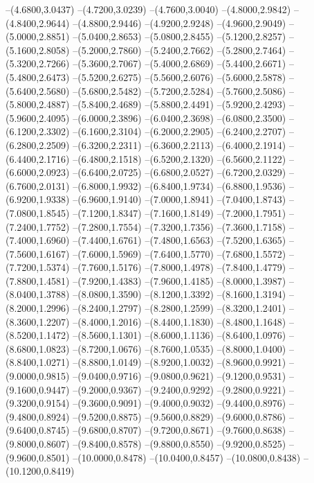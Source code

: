 {	--(4.6800,3.0437)
	--(4.7200,3.0239)
	--(4.7600,3.0040)
	--(4.8000,2.9842)
	--(4.8400,2.9644)
	--(4.8800,2.9446)
	--(4.9200,2.9248)
	--(4.9600,2.9049)
	--(5.0000,2.8851)
	--(5.0400,2.8653)
	--(5.0800,2.8455)
	--(5.1200,2.8257)
	--(5.1600,2.8058)
	--(5.2000,2.7860)
	--(5.2400,2.7662)
	--(5.2800,2.7464)
	--(5.3200,2.7266)
	--(5.3600,2.7067)
	--(5.4000,2.6869)
	--(5.4400,2.6671)
	--(5.4800,2.6473)
	--(5.5200,2.6275)
	--(5.5600,2.6076)
	--(5.6000,2.5878)
	--(5.6400,2.5680)
	--(5.6800,2.5482)
	--(5.7200,2.5284)
	--(5.7600,2.5086)
	--(5.8000,2.4887)
	--(5.8400,2.4689)
	--(5.8800,2.4491)
	--(5.9200,2.4293)
	--(5.9600,2.4095)
	--(6.0000,2.3896)
	--(6.0400,2.3698)
	--(6.0800,2.3500)
	--(6.1200,2.3302)
	--(6.1600,2.3104)
	--(6.2000,2.2905)
	--(6.2400,2.2707)
	--(6.2800,2.2509)
	--(6.3200,2.2311)
	--(6.3600,2.2113)
	--(6.4000,2.1914)
	--(6.4400,2.1716)
	--(6.4800,2.1518)
	--(6.5200,2.1320)
	--(6.5600,2.1122)
	--(6.6000,2.0923)
	--(6.6400,2.0725)
	--(6.6800,2.0527)
	--(6.7200,2.0329)
	--(6.7600,2.0131)
	--(6.8000,1.9932)
	--(6.8400,1.9734)
	--(6.8800,1.9536)
	--(6.9200,1.9338)
	--(6.9600,1.9140)
	--(7.0000,1.8941)
	--(7.0400,1.8743)
	--(7.0800,1.8545)
	--(7.1200,1.8347)
	--(7.1600,1.8149)
	--(7.2000,1.7951)
	--(7.2400,1.7752)
	--(7.2800,1.7554)
	--(7.3200,1.7356)
	--(7.3600,1.7158)
	--(7.4000,1.6960)
	--(7.4400,1.6761)
	--(7.4800,1.6563)
	--(7.5200,1.6365)
	--(7.5600,1.6167)
	--(7.6000,1.5969)
	--(7.6400,1.5770)
	--(7.6800,1.5572)
	--(7.7200,1.5374)
	--(7.7600,1.5176)
	--(7.8000,1.4978)
	--(7.8400,1.4779)
	--(7.8800,1.4581)
	--(7.9200,1.4383)
	--(7.9600,1.4185)
	--(8.0000,1.3987)
	--(8.0400,1.3788)
	--(8.0800,1.3590)
	--(8.1200,1.3392)
	--(8.1600,1.3194)
	--(8.2000,1.2996)
	--(8.2400,1.2797)
	--(8.2800,1.2599)
	--(8.3200,1.2401)
	--(8.3600,1.2207)
	--(8.4000,1.2016)
	--(8.4400,1.1830)
	--(8.4800,1.1648)
	--(8.5200,1.1472)
	--(8.5600,1.1301)
	--(8.6000,1.1136)
	--(8.6400,1.0976)
	--(8.6800,1.0823)
	--(8.7200,1.0676)
	--(8.7600,1.0535)
	--(8.8000,1.0400)
	--(8.8400,1.0271)
	--(8.8800,1.0149)
	--(8.9200,1.0032)
	--(8.9600,0.9921)
	--(9.0000,0.9815)
	--(9.0400,0.9716)
	--(9.0800,0.9621)
	--(9.1200,0.9531)
	--(9.1600,0.9447)
	--(9.2000,0.9367)
	--(9.2400,0.9292)
	--(9.2800,0.9221)
	--(9.3200,0.9154)
	--(9.3600,0.9091)
	--(9.4000,0.9032)
	--(9.4400,0.8976)
	--(9.4800,0.8924)
	--(9.5200,0.8875)
	--(9.5600,0.8829)
	--(9.6000,0.8786)
	--(9.6400,0.8745)
	--(9.6800,0.8707)
	--(9.7200,0.8671)
	--(9.7600,0.8638)
	--(9.8000,0.8607)
	--(9.8400,0.8578)
	--(9.8800,0.8550)
	--(9.9200,0.8525)
	--(9.9600,0.8501)
	--(10.0000,0.8478)
	--(10.0400,0.8457)
	--(10.0800,0.8438)
	--(10.1200,0.8419)
}
